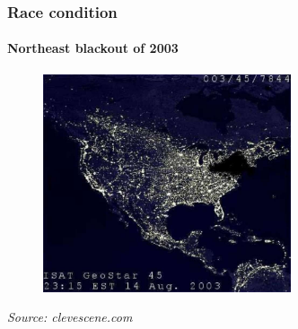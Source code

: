 \begin{frame}
\frametitle{Race condition}
\framesubtitle{Northeast blackout of 2003}

\begin{figure}
	\includegraphics[width=0.65\textwidth]{img/blackout2003.jpg}
\end{figure}
{\hspace*{\fill}\tiny\textit{Source: clevescene.com}}

\end{frame}